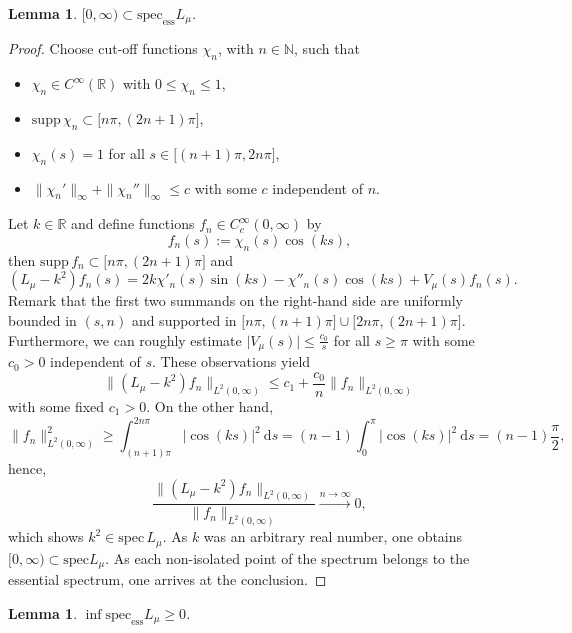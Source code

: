\documentclass[11pt,oneside,reqno,a4paper]{amsart}
\newcommand{\dd}{\mathrm{d}}
\newcommand{\N}{\mathbb{N}}
\newcommand{\R}{\mathbb{R}}
\newcommand{\specess}{\mathrm{spec}_{\mathrm{ess}}}
\newcommand{\spec}{\mathrm{spec}}
\newtheorem{lemma}[theorem]{Lemma}
\theoremstyle{definition}
\begin{document}
\begin{lemma}\label{ess1} $[0,\infty)\subset\specess L_\mu$.
\end{lemma}
\begin{proof}
Choose cut-off functions $\chi_n$, with $n\in\N$, such that
\begin{itemize}
	\item $\chi_n\in C^\infty(\R)$ with $0\le \chi_n\le 1$,
	\item $\mathrm{supp}\,\chi_n\subset\big[n\pi,(2n+1)\pi\big]$,
	\item $\chi_n(s)=1$ for all $s\in\big[(n+1)\pi,2n\pi\big]$,
	\item $\|\chi_n'\|_\infty+\|\chi_n''\|_\infty\le c$ with some $c$ independent of $n$.
\end{itemize}
Let $k\in\R$ and define functions $f_n\in C^\infty_c(0,\infty)$ by
\[
f_n(s):=\chi_n(s)\cos(ks),
\]
then $\mathrm{supp}\, f_n\subset \big[n\pi,(2n+1)\pi\big]$ and 
\[
(L_\mu-k^2)f_n (s)= 2k\chi'_n(s)\sin(ks)-\chi''_n(s)\cos(ks)+V_\mu(s) f_n(s).
\]
Remark that the first two summands on the right-hand side are uniformly bounded in $(s,n)$ and supported in $\big[n\pi,(n+1)\pi\big]\cup\big[2n\pi,(2n+1)\pi\big]$. Furthermore, we can roughly estimate $\big|V_\mu(s)\big|\le \frac{c_0}{s}$ for all $s\ge \pi$ with some $c_0>0$ independent of $s$. These observations yield
\[
\|(L_\mu-k^2)f_n\|_{L^2(0,\infty)}\le c_1+\dfrac{c_0}{n}\|f_n\|_{L^2(0,\infty)}
\]
with some fixed $c_1>0$. On the other hand,
\[
\|f_n\|^2_{L^2(0,\infty)}\ge \int_{(n+1)\pi}^{2n\pi}\big|\cos(ks)\big|^2\ \dd s=(n-1)\int_0^\pi\big|\cos(ks)\big|^2\ \dd s
=(n-1)\dfrac{\pi}{2},
\]
hence,
\[
\dfrac{\|(L_\mu-k^2)f_n\|_{L^2(0,\infty)}}{\|f_n\|_{L^2(0,\infty)}}\xrightarrow{n\to\infty}0,
\]
which shows $k^2\in\spec\, L_\mu$. As $k$ was an arbitrary real number, one obtains $[0,\infty)\subset \spec L_\mu$.
As each non-isolated point of the spectrum belongs to the essential spectrum, one arrives at the conclusion.
\end{proof}

\begin{lemma} $\inf\specess L_\mu\ge 0$.
\end{lemma}
\end{document}
